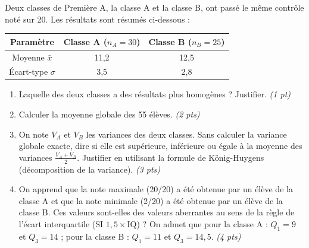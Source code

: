 \documentclass[11pt]{article}
\begin{document}
\begin{exercice}
Deux classes de Première A, la classe A et la classe B, ont passé le même contrôle noté sur 20. Les résultats sont résumés ci-dessous :

\begin{center}
\begin{tabular}{|c|c|c|}
\hline
Paramètre & Classe A ($n_A=30$) & Classe B ($n_B=25$) \\
\hline
Moyenne $\bar{x}$ & 11,2 & 12,5 \\
\hline
Écart-type $\sigma$ & 3,5 & 2,8 \\
\hline
\end{tabular}
\end{center}

\begin{enumerate}
    \item Laquelle des deux classes a des résultats plus homogènes ? Justifier. \textit{(1 pt)}
    \item Calculer la moyenne globale des \num{55} élèves. \textit{(2 pts)}
    \item On note $V_A$ et $V_B$ les variances des deux classes. Sans calculer la variance globale exacte, dire si elle est supérieure, inférieure ou égale à la moyenne des variances $\frac{V_A+V_B}{2}$. Justifier en utilisant la formule de König-Huygens (décomposition de la variance). \textit{(3 pts)}
    \item On apprend que la note maximale (20/20) a été obtenue par un élève de la classe A et que la note minimale (2/20) a été obtenue par un élève de la classe B. Ces valeurs sont-elles des valeurs aberrantes au sens de la règle de l'écart interquartile (SI $1,5 \times \text{IQ}$) ? On admet que pour la classe A : $Q_1=9$ et $Q_3=14$ ; pour la classe B : $Q_1=11$ et $Q_3=14,5$. \textit{(4 pts)}
\end{enumerate}
\end{exercice}
\end{document}
